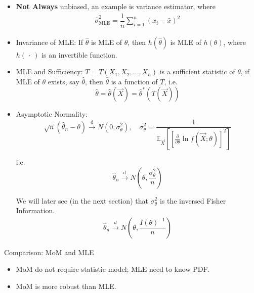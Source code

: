         
    \begin{itemize}
        \item \textbf{Not Always} unbiased, an example is variance estimator, where
        \begin{align}
            \hat{\sigma }^2_\mathrm{MLE}=\dfrac{1}{n}\sum_{i=1}^n(x_i-\bar{x})^2  
        \end{align}
        
         
        \item Invariance of MLE: If $\hat{\theta}$ is MLE of $\theta$,  then $h(\hat{\theta})$ is MLE of $h(\theta)$, where $ h(\, \cdot \, ) $ is an invertible function.
        \item MLE and Sufficiency: $T=T(X_1,X_2,\ldots,X_n)$ is a sufficient statistic of $\theta$, if MLE of $\theta$ exists, say $\hat{\theta}$, then $\hat{\theta}$ is a function of $T$, i.e.
        \begin{equation}  
            \hat{\theta}=\hat{\theta}(\vec{X})=\hat{\theta}^*(T(\vec{X}))    
        \end{equation}
        \item Asymptotic Normality: 
        \begin{equation}
            \sqrt{n}(\hat{\theta}_n-\theta) \xrightarrow[]{\mathrm{d}}N(0,\sigma^2_\theta),\quad \sigma^2_\theta=\frac{1}{\mathbb{E}_{\vec{X}}\left[[\frac{\partial}{\partial\theta}\ln f(\vec{X};\theta)]^2\right]}   
        \end{equation}

        i.e.
        \begin{equation}
            \hat{\theta}_n\xrightarrow[]{\mathrm{d}}N(\theta,\frac{\sigma^2_\theta}{n})    
        \end{equation}
        
        We will later see (in the next section) that $ \sigma _\theta ^2 $ is the inversed Fisher Information.
        \begin{align}\label{EqaAsymptoticDistributionMLE}
            \hat{\theta }_n\xrightarrow[]{d} N(\theta ,\dfrac{I(\theta )^{-1}}{n})
        \end{align}
        
        
    \end{itemize}

    \begin{point}
        Comparison: MoM and MLE
    \end{point}
    
        
    \begin{itemize}
        \item MoM do not require statistic model; MLE need to know PDF.
        \item MoM is more robust than MLE.
    \end{itemize}


